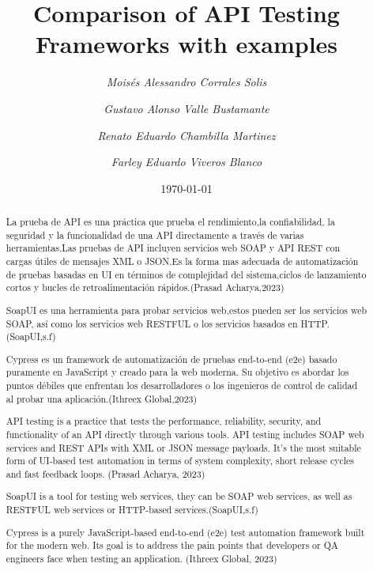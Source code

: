 \documentclass{article}
\begin{document}
	
	\title{Comparison of API Testing Frameworks with examples}
	\author{
	\textit{Moisés Alessandro Corrales Solis} \and 
	\textit{Gustavo Alonso Valle Bustamante} \and 
	\textit{Renato Eduardo Chambilla Martinez} \and 
	\textit{Farley Eduardo Viveros Blanco}
}
	\date{\today}
	
	\maketitle
	\begin{abstract}
		\begin{justify}
		La prueba de API es una práctica que prueba el rendimiento,la confiabilidad, la seguridad y la funcionalidad de una API directamente a través de varias herramientas.Las pruebas de API incluyen servicios web SOAP y API REST con cargas útiles de mensajes XML o JSON.Es la forma mas adecuada de automatización de pruebas basadas en UI en términos de complejidad del sistema,ciclos de lanzamiento cortos y bucles de retroalimentación rápidos.(Prasad Acharya,2023)
		
		SoapUI es una herramienta para probar servicios web,estos pueden ser los servicios web SOAP, así como los servicios web RESTFUL o los servicios basados en HTTP.(SoapUI,s.f)
		
		Cypress es un framework de automatización de pruebas end-to-end (e2e) basado puramente en JavaScript y creado para la web moderna. Su objetivo es abordar los puntos débiles que enfrentan los desarrolladores o los ingenieros de control de calidad al probar una aplicación.(Ithreex Global,2023)
		\end{justify}
	\end{abstract}
	
	
	
	\begin{abstract}
		\begin{justify}
			API testing is a practice that tests the performance, reliability, security, and functionality of an API directly through various tools. API testing includes SOAP web services and REST APIs with XML or JSON message payloads. It’s  the most suitable form of UI-based test automation in terms of system complexity, short release cycles and fast feedback loops. (Prasad Acharya, 2023)
			
			SoapUI is a tool for testing web services, they can be SOAP web services, as well as RESTFUL web services or HTTP-based services.(SoapUI,s.f)
			
			Cypress is a purely JavaScript-based end-to-end (e2e) test automation framework built for the modern web. Its goal is to address the pain points that developers or QA engineers face when testing an application. (Ithreex Global, 2023)
			
		\end{justify}
	\end{abstract}
	
\end{document}
